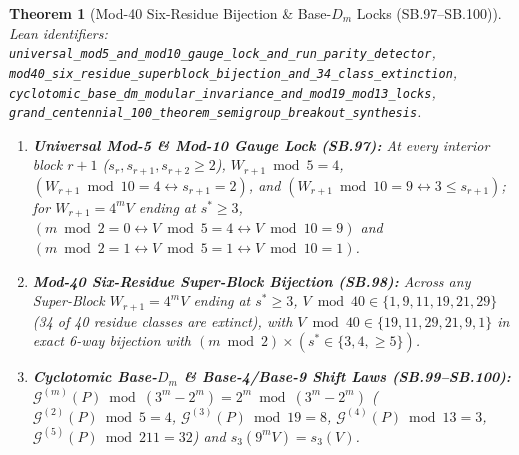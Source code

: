 \documentclass[11pt]{article}
\newtheorem{theorem}{Theorem}[section]
\begin{document}
\begin{theorem}[Mod-40 Six-Residue Bijection \& Base-$D_m$ Locks (SB.97--SB.100)]
\emph{Lean identifiers:} \nolinkurl{universal_mod5_and_mod10_gauge_lock_and_run_parity_detector}, \nolinkurl{mod40_six_residue_superblock_bijection_and_34_class_extinction}, \nolinkurl{cyclotomic_base_dm_modular_invariance_and_mod19_mod13_locks}, \nolinkurl{grand_centennial_100_theorem_semigroup_breakout_synthesis}.
\begin{enumerate}
  \item \textbf{Universal Mod-5 \& Mod-10 Gauge Lock (SB.97):} At every interior block $r + 1$ ($s_r, s_{r+1}, s_{r+2} \ge 2$), $W_{r+1} \bmod 5 = 4$, $(W_{r+1} \bmod 10 = 4 \leftrightarrow s_{r+1} = 2)$, and $(W_{r+1} \bmod 10 = 9 \leftrightarrow 3 \le s_{r+1})$; for $W_{r+1} = 4^m V$ ending at $s^* \ge 3$, $(m \bmod 2 = 0 \leftrightarrow V \bmod 5 = 4 \leftrightarrow V \bmod 10 = 9)$ and $(m \bmod 2 = 1 \leftrightarrow V \bmod 5 = 1 \leftrightarrow V \bmod 10 = 1)$.
  \item \textbf{Mod-40 Six-Residue Super-Block Bijection (SB.98):} Across any Super-Block $W_{r+1} = 4^m V$ ending at $s^* \ge 3$, $V \bmod 40 \in \{1, 9, 11, 19, 21, 29\}$ (34 of 40 residue classes are extinct), with $V \bmod 40 \in \{19, 11, 29, 21, 9, 1\}$ in exact 6-way bijection with $(m \bmod 2) \times (s^* \in \{3, 4, \ge 5\})$.
  \item \textbf{Cyclotomic Base-$D_m$ \& Base-4/Base-9 Shift Laws (SB.99--SB.100):} $\mathcal{G}^{(m)}(P) \bmod (3^m - 2^m) = 2^m \bmod (3^m - 2^m)$ ($\mathcal{G}^{(2)}(P) \bmod 5 = 4$, $\mathcal{G}^{(3)}(P) \bmod 19 = 8$, $\mathcal{G}^{(4)}(P) \bmod 13 = 3$, $\mathcal{G}^{(5)}(P) \bmod 211 = 32$) and $s_3(9^m V) = s_3(V)$.
\end{enumerate}
\end{theorem}
\end{document}
